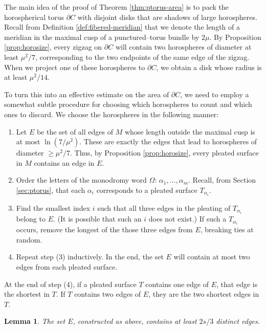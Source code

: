 \documentclass[11pt]{amsart}
\newcommand{\bdy}{{\partial}}
\theoremstyle{plain}
\newtheorem{lemma}[theorem]{Lemma}
\theoremstyle{definition}
\begin{document}
The main idea of the proof of Theorem \ref{thm:ptorus-area} is to pack
the horospherical torus $\bdy C$ with disjoint disks that are shadows
of large horospheres.  Recall from Definition
\ref{def:fibered-meridian} that we denote the length of a meridian in
the maximal cusp of a punctured--torus bundle by $2\mu$.  By
Proposition \ref{prop:horosize}, every zigzag on $\bdy C$ will contain
two horospheres of diameter at least $\mu^2/7$, corresponding to the
two endpoints of the same edge of the zigzag.  When we project one of
these horospheres to $\bdy C$, we obtain a disk whose radius is at
least $\mu^2/14$.

To turn this into an effective estimate on the area of $\bdy C$, we
need to employ a somewhat subtle procedure for choosing which
horospheres to count and which ones to discard. We choose the
horospheres in the following manner:

\begin{enumerate}
\item Let $E$ be the set of all edges of $M$ whose length outside the
maximal cusp is at most $\ln(7/\mu^2)$. These are exactly the edges
that lead to horospheres of diameter $ \geq \mu^2/7$. Thus, by
Proposition \ref{prop:horosize}, every pleated surface in $M$ contains
an edge in $E$.

\item Order the letters of the monodromy word $\Omega$: $\alpha_1,
\ldots, \alpha_m$. Recall, from Section \ref{sec:ptorus}, that each
$\alpha_i$ corresponds to a pleated surface $T_{\alpha_i}$.

\item Find the smallest index $i$ such that all three edges in the
pleating of $T_{\alpha_i}$ belong to $E$. (It is possible that such an
$i$ does not exist.) If such a $T_{\alpha_i}$ occurs, remove the
longest of the those three edges from $E$, breaking ties at random.

\item Repeat step (3) inductively. In the end, the set $E$ will
contain at most two edges from each pleated surface.
\end{enumerate}

At the end of step (4), if a pleated surface $T$ contains one edge of
$E$, that edge is the shortest in $T$. If $T$ contains two edges of
$E$, they are the two shortest edges in $T$.

\begin{lemma}\label{lemma:edge-count}
The set $E$, constructed as above, contains at least $2s/3$ distinct
edges.
\end{lemma}
\end{document}
